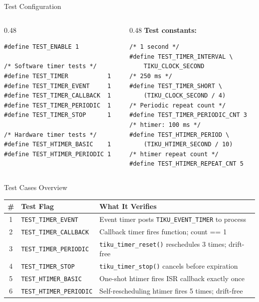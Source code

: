\documentclass[aspectratio=169, 10pt]{beamer}
\begin{document}
\begin{frame}[fragile]{Test Configuration}
\begin{columns}[T]
\begin{column}{0.48\textwidth}
\begin{lstlisting}[style=cstyle, title={tests/tiku\_test\_config.h}]
#define TEST_ENABLE 1

/* Software timer tests */
#define TEST_TIMER           1
#define TEST_TIMER_EVENT     1
#define TEST_TIMER_CALLBACK  1
#define TEST_TIMER_PERIODIC  1
#define TEST_TIMER_STOP      1

/* Hardware timer tests */
#define TEST_HTIMER_BASIC    1
#define TEST_HTIMER_PERIODIC 1
\end{lstlisting}
\end{column}

\begin{column}{0.48\textwidth}
\textbf{Test constants:}
\begin{lstlisting}[style=cstyle]
/* 1 second */
#define TEST_TIMER_INTERVAL \
    TIKU_CLOCK_SECOND
/* 250 ms */
#define TEST_TIMER_SHORT \
    (TIKU_CLOCK_SECOND / 4)
/* Periodic repeat count */
#define TEST_TIMER_PERIODIC_CNT 3
/* htimer: 100 ms */
#define TEST_HTIMER_PERIOD \
    (TIKU_HTIMER_SECOND / 10)
/* htimer repeat count */
#define TEST_HTIMER_REPEAT_CNT 5
\end{lstlisting}
\end{column}
\end{columns}
\end{frame}

\begin{frame}{Test Cases Overview}
\begin{table}
\centering
\small
\begin{tabular}{@{}clp{7.5cm}@{}}
\toprule
\textbf{\#} & \textbf{Test Flag} & \textbf{What It Verifies} \\
\midrule
1 & \texttt{TEST\_TIMER\_EVENT}     & Event timer posts \texttt{TIKU\_EVENT\_TIMER} to process \\
2 & \texttt{TEST\_TIMER\_CALLBACK}  & Callback timer fires function; count == 1 \\
3 & \texttt{TEST\_TIMER\_PERIODIC}  & \texttt{tiku\_timer\_reset()} reschedules 3 times; drift-free \\
4 & \texttt{TEST\_TIMER\_STOP}      & \texttt{tiku\_timer\_stop()} cancels before expiration \\
5 & \texttt{TEST\_HTIMER\_BASIC}    & One-shot htimer fires ISR callback exactly once \\
6 & \texttt{TEST\_HTIMER\_PERIODIC} & Self-rescheduling htimer fires 5 times; drift-free \\
\bottomrule
\end{tabular}
\end{table}
\end{frame}
\end{document}
